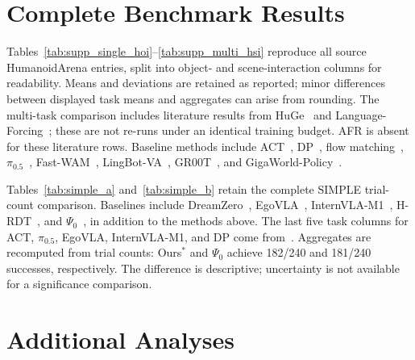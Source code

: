 \section{Complete Benchmark Results}
Tables~\ref{tab:supp_single_hoi}--\ref{tab:supp_multi_hsi} reproduce all source HumanoidArena entries, split into object- and scene-interaction columns for readability. Means and deviations are retained as reported; minor differences between displayed task means and aggregates can arise from rounding. The multi-task comparison includes literature results from HuGe~\cite{liu2026huge} and Language-Forcing~\cite{li2026languageforcing}; these are not re-runs under an identical training budget. AFR is absent for these literature rows. Baseline methods include ACT~\cite{ACT}, DP~\cite{chi2023diffusionpolicy}, flow matching~\cite{FM_objective}, $\pi_{0.5}$~\cite{pi05}, Fast-WAM~\cite{yuan2026fastwam}, LingBot-VA~\cite{li2026lingbotva}, GR00T~\cite{grootn1}, and GigaWorld-Policy~\cite{gigaworld2026policy05}.






Tables~\ref{tab:simple_a} and~\ref{tab:simple_b} retain the complete SIMPLE trial-count comparison. Baselines include DreamZero~\cite{dreamzero}, EgoVLA~\cite{egovla}, InternVLA-M1~\cite{internvla_m1}, H-RDT~\cite{hrdt}, and $\Psi_0$~\cite{psi0}, in addition to the methods above. The last five task columns for ACT, $\pi_{0.5}$, EgoVLA, InternVLA-M1, and DP come from~\cite{chen2026memorybeforegoal}. Aggregates are recomputed from trial counts: Ours$^{*}$ and $\Psi_0$ achieve 182/240 and 181/240 successes, respectively. The difference is descriptive; uncertainty is not available for a significance comparison.



\section{Additional Analyses}
